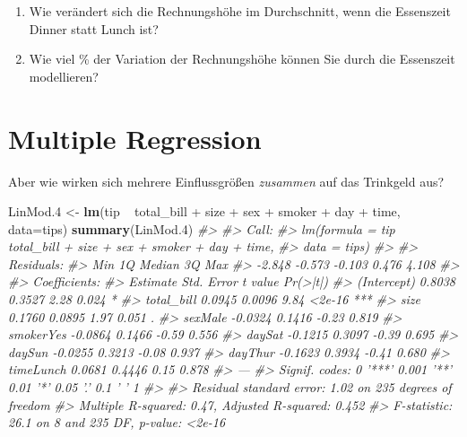 \documentclass[12pt,ngerman,]{book}
\makeatletter
\newenvironment{Shaded}{\begin{snugshade}}{\end{snugshade}}
\newcommand{\KeywordTok}[1]{\textcolor[rgb]{0.13,0.29,0.53}{\textbf{{#1}}}}
\newcommand{\DataTypeTok}[1]{\textcolor[rgb]{0.13,0.29,0.53}{{#1}}}
\newcommand{\FloatTok}[1]{\textcolor[rgb]{0.00,0.00,0.81}{{#1}}}
\newcommand{\StringTok}[1]{\textcolor[rgb]{0.31,0.60,0.02}{{#1}}}
\newcommand{\CommentTok}[1]{\textcolor[rgb]{0.56,0.35,0.01}{\textit{{#1}}}}
\newcommand{\NormalTok}[1]{{#1}}
\providecommand{\tightlist}{%
  \setlength{\itemsep}{0pt}\setlength{\parskip}{0pt}}
\newenvironment{kframe}{%
\medskip{}
\setlength{\fboxsep}{.8em}
 \def\at@end@of@kframe{}%
 \ifinner\ifhmode%
  \def\at@end@of@kframe{\end{minipage}}%
  \begin{minipage}{\columnwidth}%
 \fi\fi%
 \def\FrameCommand##1{\hskip\@totalleftmargin \hskip-\fboxsep
 \colorbox{shadecolor}{##1}\hskip-\fboxsep
     \hskip-\linewidth \hskip-\@totalleftmargin \hskip\columnwidth}%
 \MakeFramed {\advance\hsize-\width
   \@totalleftmargin\z@ \linewidth\hsize
   \@setminipage}}%
 {\par\unskip\endMakeFramed%
 \at@end@of@kframe}
\renewenvironment{Shaded}{\begin{kframe}}{\end{kframe}}
\let\BeginKnitrBlock\begin \let\EndKnitrBlock\end
\makeatother
\begin{document}
\BeginKnitrBlock{rmdexercises}
\begin{enumerate}
\def\labelenumi{\arabic{enumi}.}
\setcounter{enumi}{2}
\tightlist
\item
  Wie verändert sich die Rechnungshöhe im Durchschnitt, wenn die
  Essenszeit Dinner statt Lunch ist?
\item
  Wie viel \% der Variation der Rechnungshöhe können Sie durch die
  Essenszeit modellieren?
\end{enumerate}
\EndKnitrBlock{rmdexercises}

\section{Multiple Regression}\label{multiple-regression}

Aber wie wirken sich mehrere Einflussgrößen \emph{zusammen} auf das
Trinkgeld aus?

\begin{Shaded}
\begin{Highlighting}[]
\NormalTok{LinMod}\FloatTok{.4} \NormalTok{<-}\StringTok{ }\KeywordTok{lm}\NormalTok{(tip ~}\StringTok{ }\NormalTok{total_bill +}\StringTok{ }\NormalTok{size +}\StringTok{ }\NormalTok{sex  +}\StringTok{ }\NormalTok{smoker +}\StringTok{ }\NormalTok{day +}\StringTok{ }\NormalTok{time, }\DataTypeTok{data=}\NormalTok{tips)}
\KeywordTok{summary}\NormalTok{(LinMod}\FloatTok{.4}\NormalTok{)}
\CommentTok{#> }
\CommentTok{#> Call:}
\CommentTok{#> lm(formula = tip ~ total_bill + size + sex + smoker + day + time, }
\CommentTok{#>     data = tips)}
\CommentTok{#> }
\CommentTok{#> Residuals:}
\CommentTok{#>    Min     1Q Median     3Q    Max }
\CommentTok{#> -2.848 -0.573 -0.103  0.476  4.108 }
\CommentTok{#> }
\CommentTok{#> Coefficients:}
\CommentTok{#>             Estimate Std. Error t value Pr(>|t|)    }
\CommentTok{#> (Intercept)   0.8038     0.3527    2.28    0.024 *  }
\CommentTok{#> total_bill    0.0945     0.0096    9.84   <2e-16 ***}
\CommentTok{#> size          0.1760     0.0895    1.97    0.051 .  }
\CommentTok{#> sexMale      -0.0324     0.1416   -0.23    0.819    }
\CommentTok{#> smokerYes    -0.0864     0.1466   -0.59    0.556    }
\CommentTok{#> daySat       -0.1215     0.3097   -0.39    0.695    }
\CommentTok{#> daySun       -0.0255     0.3213   -0.08    0.937    }
\CommentTok{#> dayThur      -0.1623     0.3934   -0.41    0.680    }
\CommentTok{#> timeLunch     0.0681     0.4446    0.15    0.878    }
\CommentTok{#> ---}
\CommentTok{#> Signif. codes:  0 '***' 0.001 '**' 0.01 '*' 0.05 '.' 0.1 ' ' 1}
\CommentTok{#> }
\CommentTok{#> Residual standard error: 1.02 on 235 degrees of freedom}
\CommentTok{#> Multiple R-squared:  0.47,   Adjusted R-squared:  0.452 }
\CommentTok{#> F-statistic: 26.1 on 8 and 235 DF,  p-value: <2e-16}
\end{Highlighting}
\end{Shaded}
\end{document}
